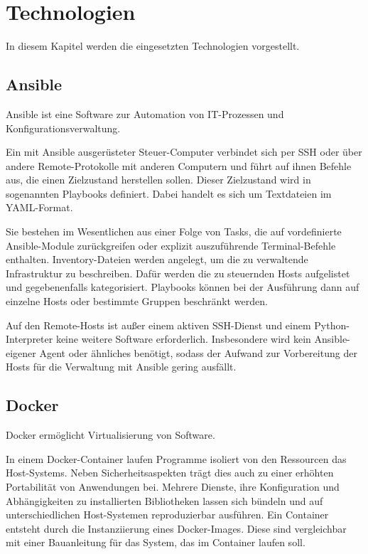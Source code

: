 \chapter{Technologien}\label{ch:technologien}

In diesem Kapitel werden die eingesetzten Technologien vorgestellt.

\section{Ansible}\label{sec:ansible}

Ansible ist eine Software zur Automation von IT-Prozessen und Konfigurationsverwaltung.

Ein mit Ansible ausgerüsteter Steuer-Computer verbindet sich per SSH oder über andere Remote-Protokolle mit anderen Computern und führt auf ihnen Befehle aus, die einen Zielzustand herstellen sollen.
Dieser Zielzustand wird in sogenannten Playbooks definiert.
Dabei handelt es sich um Textdateien im YAML-Format.

Sie bestehen im Wesentlichen aus einer Folge von Tasks, die auf vordefinierte Ansible-Module zurückgreifen oder explizit auszuführende Terminal-Befehle enthalten.
Inventory-Dateien werden angelegt, um die zu verwaltende Infrastruktur zu beschreiben.
Dafür werden die zu steuernden Hosts aufgelistet und gegebenenfalls kategorisiert.
Playbooks können bei der Ausführung dann auf einzelne Hosts oder bestimmte Gruppen beschränkt werden.

Auf den Remote-Hosts ist außer einem aktiven SSH-Dienst und einem Python-Interpreter keine weitere Software erforderlich.
Insbesondere wird kein Ansible-eigener Agent oder ähnliches benötigt, sodass der Aufwand zur Vorbereitung der Hosts für die Verwaltung mit Ansible gering ausfällt.

\section{Docker}\label{sec:docker}

Docker ermöglicht Virtualisierung von Software.

In einem Docker-Container laufen Programme isoliert von den Ressourcen das Host-Systems.
Neben Sicherheitsaspekten trägt dies auch zu einer erhöhten Portabilität von Anwendungen bei.
Mehrere Dienste, ihre Konfiguration und Abhängigkeiten zu installierten Bibliotheken lassen sich bündeln und auf unterschiedlichen Host-Systemen reproduzierbar ausführen.
Ein Container entsteht durch die Instanziierung eines Docker-Images.
Diese sind vergleichbar mit einer Bauanleitung für das System, das im Container laufen soll.

